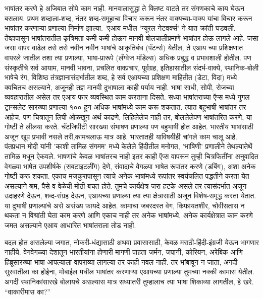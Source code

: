 भाषांतर करणे हे अजिबात सोपे काम नाही. मानवालासुद्धा ते क्लिष्ट वाटते तर संगणकाचे काय घेऊन बसलाय. प्रथम शब्दाला-शब्द, नंतर शब्द-समूहाचा विचार करून नंतर वाक्यच्या-वाक्य यांचा विचार करून भाषांतर करणाऱ्या प्रणाल्या निर्माण झाल्या. 'एआय मधील 'न्यूरल नेटवर्क्स' ने यात क्रांती घडवली. तेंव्हापासून भाषांतरातील कृत्रिमता कमी कमी होऊन मानवी बोलचालीप्रमाणे भाषांतर होऊ लागले आहे. जसा जसा वापर वाढेल तसे तसे नवीन नवीन भाषांचे आकृतिबंध (पॅटर्न्स) येतील, ते एआय च्या प्रशिक्षणात वापरले जातील तशा त्या प्रणाल्या, भाषा-प्रारूपे (लँग्वेज मॉडेल्स) अधिक प्रबुद्ध व प्रभावशाली होतील. पण संस्कृतीचे सर्व आयाम, मानवी भावना, प्रचलित वाक्प्रचार, पूर्वग्रह, इतिहासातील संदर्भ-वाक्ये, स्थानिक-बोली भाषेचे रंग, विशिष्ठ तंत्रज्ञानासंदर्भातील शब्द, हे सर्व एआयच्या प्रशिक्षण माहितीत (डेटा, विदा) मध्ये क्वचितच असल्याने, अजूनही तज्ञ मानवी दुभाषाला काही पर्याय नाही. भाषा साधी, सोपी, रोजच्या व्यवहारातील असेल तर एआय फार व्यवस्थित काम करताना दिसते.  सध्या भाषांतराच्या ऍप्स मध्ये गुगल ट्रान्सलेट सारख्या प्रणाल्या १०० हुन अधिक भाषांमध्ये काम करू शकतात. त्यात बहुभाषी भाषांतर तर आहेच, पण चित्रातून लिपी ओळखून अर्थ काढणे, लिहिलेलेच नाही तर, बोललेलेपण भाषांतरित करणे, या गोष्टी ते लीलया करते. चॅटजिपीटी सारख्या संभाषण प्रणाल्या पण बहुभाषी होत आहेत. भारतीय भाषांसाठी अजून खूप प्रभावी नसले तरी,कामचलाऊ मात्र आहे. भारतातही याविषयीही चांगले काम चालू आहे. पंतप्रधान मोदी यांनी 'काशी तामिळ संगमम' मध्ये केलेले हिंदीतील मनोगत, 'भाषिणी' प्रणालीने तेथल्यातेथें तामिळ मधून ऐकवले.  भाषणांचे केवळ भाषांतरच नाही इतर काही ऍप्स वापरून तुम्ही चित्रफितींना अनुवादित वेगळ्या भाषेत उपशीर्षके (सबटाइटलींग) देणे, संवादाचे वेगळ्या भाषेत रूपांतर करणे (डबिंग), अशा अनेक गोष्टी करू शकता. एकाच मजकुरापासून त्याचे अनेक भाषांमध्ये रूपांतर स्वयंचलित पद्धतीने करता येत असल्याने श्रम, पैसे व वेळेची मोठी बचत होते. तुमचे कार्यक्षेत्र जरा हटके असले तर त्यासंदर्भात अजून उदाहरणे देऊन, शब्द-संग्रह देऊन, एआयच्या प्रणाल्या त्या त्या क्षेत्रासाठी अजून विशेष-समृद्ध करता येतात. या दुभाषी प्रणाल्यांचे असे असंख्य फायदे आहेत. कामाचा जबरदस्त वेग, किफायतशीर, चोवीसतास न थकता न विश्रांती घेता काम करणे आणि एकाच नाही तर अनेक भाषांमध्ये, अनेक कार्यक्षेत्रात काम करणे जमत असल्याने एआय आधारित भाषांतराला तोड नाही.

बदल होत असलेल्या जगात, नोकरी-धंद्यासाठी अथवा प्रवासासाठी, केवळ मराठी-हिंदी-इंग्रजी येऊन भागणार नाहीये. वेगवेगळ्या देशातून भारतीयांना होणारी मागणी पाहता जर्मन, जपानी, कोरियन, अरेबिक आणि हिब्रूसारख्या भाषा आपल्याला वापराव्या लागल्या तर काही नवल नाही. तर भांबावून न जाता, अगदी सुरवातीला का होईना, मोबाईल मधील भाषांतर करणाऱ्या एआयच्या प्रणाल्या तुमच्या नक्की कामास येतील. अगदी स्थानिकांसारखे बोलायचे असल्यास मात्र सध्यातरी तुम्हालाच त्या भाषा शिकाव्या लागतील, हे खरे. ``वाकारीमास का?'' %